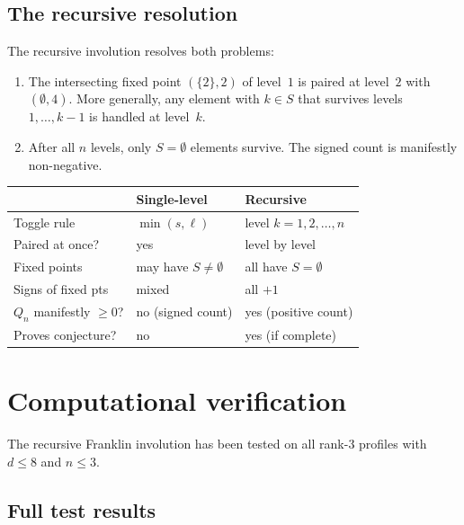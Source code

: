 \documentclass[11pt]{article}
\theoremstyle{plain}
\theoremstyle{definition}
\begin{document}
\subsection{The recursive resolution}

The recursive involution resolves both problems:
\begin{enumerate}
  \item The intersecting fixed point $(\{2\}, 2)$ of
    level~$1$ is paired at level~$2$ with
    $(\emptyset, 4)$.  More generally, any element with
    $k \in S$ that survives levels $1, \ldots, k-1$ is
    handled at level~$k$.

  \item After all $n$ levels, only $S = \emptyset$
    elements survive.  The signed count is manifestly
    non-negative.
\end{enumerate}

\begin{center}
\begin{tabular}{l|l|l}
  & \textbf{Single-level} &
    \textbf{Recursive} \\ \hline
Toggle rule &
  $\min(s, \ell)$ &
  level $k = 1, 2, \ldots, n$ \\
Paired at once? &
  yes &
  level by level \\
Fixed points &
  may have $S \neq \emptyset$ &
  all have $S = \emptyset$ \\
Signs of fixed pts &
  mixed &
  all $+1$ \\
$Q_n$ manifestly $\geq 0$? &
  no (signed count) &
  yes (positive count) \\
Proves conjecture? &
  no &
  yes (if complete)
\end{tabular}
\end{center}


\section{Computational verification}
\label{sec:computation}

The recursive Franklin involution has been tested on
all rank-$3$ profiles with $d \leq 8$ and
$n \leq 3$.


\subsection{Full test results}
\end{document}
